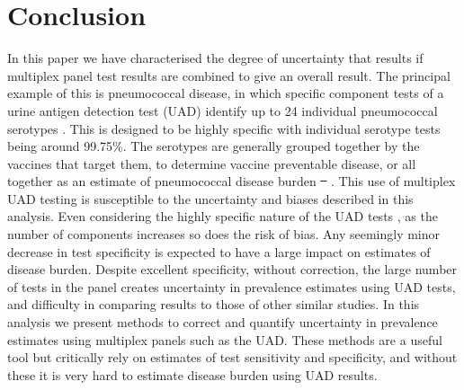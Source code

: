 \documentclass[10pt,letterpaper]{article}
\providecommand{\DIFaddtex}[1]{{\protect\color{blue}\uwave{#1}}} %
\providecommand{\DIFdeltex}[1]{{\protect\color{red}\sout{#1}}}                      %
\providecommand{\DIFaddbegin}{} %
\providecommand{\DIFaddend}{} %
\providecommand{\DIFdelbegin}{} %
\providecommand{\DIFdelend}{} %
\providecommand{\DIFadd}[1]{\texorpdfstring{\DIFaddtex{#1}}{#1}} %
\providecommand{\DIFdel}[1]{\texorpdfstring{\DIFdeltex{#1}}{}} %
\newcommand{\DIFscaledelfig}{0.5}
\newlength{\DIFdelgraphicswidth} %
\newlength{\DIFdelgraphicsheight} %
\newcommand{\DIFaddincludegraphics}[2][]{{\color{blue}\fbox{\DIFOincludegraphics[#1]{#2}}}} %
\newcommand{\DIFdelincludegraphics}[2][]{%
\sbox{\DIFdelgraphicsbox}{\DIFOincludegraphics[#1]{#2}}%
\settoboxwidth{\DIFdelgraphicswidth}{\DIFdelgraphicsbox} %
\settoboxtotalheight{\DIFdelgraphicsheight}{\DIFdelgraphicsbox} %
\scalebox{\DIFscaledelfig}{%
\parbox[b]{\DIFdelgraphicswidth}{\usebox{\DIFdelgraphicsbox}\\[-\baselineskip] \rule{\DIFdelgraphicswidth}{0em}}\llap{\resizebox{\DIFdelgraphicswidth}{\DIFdelgraphicsheight}{%
\setlength{\unitlength}{\DIFdelgraphicswidth}%
\begin{picture}(1,1)%
\thicklines\linethickness{2pt} %
{\color[rgb]{1,0,0}\put(0,0){\framebox(1,1){}}}%
{\color[rgb]{1,0,0}\put(0,0){\line( 1,1){1}}}%
{\color[rgb]{1,0,0}\put(0,1){\line(1,-1){1}}}%
\end{picture}%
}\hspace*{3pt}}} %
} %
\DeclareRobustCommand{\DIFaddbegin}{\DIFOaddbegin \let\includegraphics\DIFaddincludegraphics} %
\DeclareRobustCommand{\DIFaddend}{\DIFOaddend \let\includegraphics\DIFOincludegraphics} %
\DeclareRobustCommand{\DIFdelbegin}{\DIFOdelbegin \let\includegraphics\DIFdelincludegraphics} %
\DeclareRobustCommand{\DIFdelend}{\DIFOaddend \let\includegraphics\DIFOincludegraphics} %
\begin{document}
\section*{Conclusion}

In this paper we have characterised the degree of uncertainty that results if multiplex panel test results are combined to give an overall result. The principal example of this is pneumococcal disease, in which specific component tests of a urine antigen detection test (UAD) identify up to 24 individual pneumococcal serotypes \cite{pride2012,bonten2015}. This is designed to be highly specific with individual serotype tests being around 99.75\%. The serotypes are generally grouped together by the vaccines that target them, to determine vaccine preventable disease, or all together as an estimate of pneumococcal disease burden \DIFdelbegin \DIFdel{\mbox{%
\cite{hyams2023a}}\hspace{0pt}%
}\DIFdelend \DIFaddbegin \DIFadd{\mbox{%
\cite{hyams2023}}\hspace{0pt}%
}\DIFaddend . This use of multiplex UAD testing is susceptible to the uncertainty and biases described in this analysis. Even considering the highly specific nature of the UAD tests \cite{pride2012}, as the number of components increases so does the risk of bias. Any seemingly minor decrease in test specificity is expected to have a large impact on estimates of disease burden. Despite excellent specificity, without correction, the large number of tests in the panel creates uncertainty in prevalence estimates using UAD tests, and difficulty in comparing results to those of other similar studies. In this analysis we present methods to correct and quantify uncertainty in prevalence estimates using multiplex panels such as the UAD. These methods are a useful tool but critically rely on estimates of test sensitivity and specificity, and without these it is very hard to estimate disease burden using UAD results.
\end{document}
